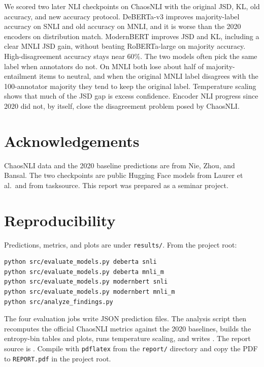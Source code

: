 \documentclass[11pt,a4paper]{article}
\begin{document}
We scored two later NLI checkpoints on ChaosNLI with the original JSD, KL, old accuracy, and new accuracy protocol. DeBERTa-v3 improves majority-label accuracy on SNLI and old accuracy on MNLI, and it is worse than the 2020 encoders on distribution match. ModernBERT improves JSD and KL, including a clear MNLI JSD gain, without beating RoBERTa-large on majority accuracy. High-disagreement accuracy stays near 60\%. The two models often pick the same label when annotators do not. On MNLI both lose about half of majority-entailment items to neutral, and when the original MNLI label disagrees with the 100-annotator majority they tend to keep the original label. Temperature scaling shows that much of the JSD gap is excess confidence. Encoder NLI progress since 2020 did not, by itself, close the disagreement problem posed by ChaosNLI.

\section*{Acknowledgements}

ChaosNLI data and the 2020 baseline predictions are from Nie, Zhou, and Bansal. The two checkpoints are public Hugging Face models from Laurer et al.\ and from tasksource. This report was prepared as a seminar project.

\appendix
\section{Reproducibility}

Predictions, metrics, and plots are under \texttt{results/}. From the project root:

\begin{verbatim}
python src/evaluate_models.py deberta snli
python src/evaluate_models.py deberta mnli_m
python src/evaluate_models.py modernbert snli
python src/evaluate_models.py modernbert mnli_m
python src/analyze_findings.py
\end{verbatim}

The four evaluation jobs write JSON prediction files. The analysis script then recomputes the official ChaosNLI metrics against the 2020 baselines, builds the entropy-bin tables and plots, runs temperature scaling, and writes . The report source is . Compile with \texttt{pdflatex} from the \texttt{report/} directory and copy the PDF to \texttt{REPORT.pdf} in the project root.
\end{document}
